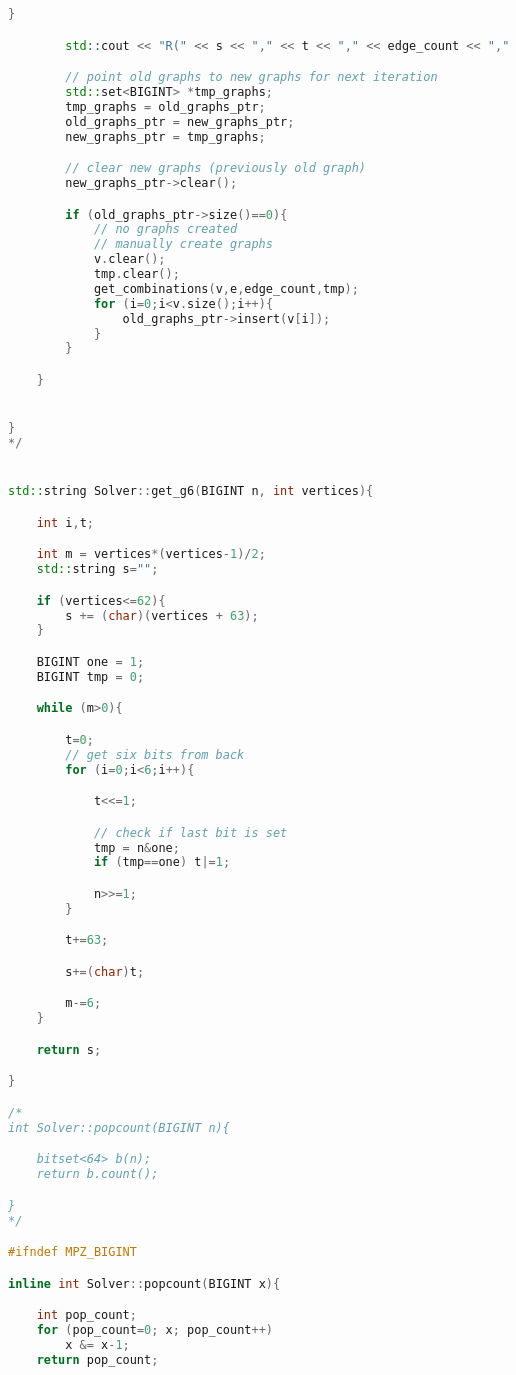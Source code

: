\documentclass[12pt]{etsu_thesis}
\begin{document}
\begin{lstlisting}[language=C++]
        }

        std::cout << "R(" << s << "," << t << "," << edge_count << "," << n << ") = " << new_graphs_ptr->size() << std::endl;

        // point old graphs to new graphs for next iteration
        std::set<BIGINT> *tmp_graphs;
        tmp_graphs = old_graphs_ptr;
        old_graphs_ptr = new_graphs_ptr;
        new_graphs_ptr = tmp_graphs;

        // clear new graphs (previously old graph)
        new_graphs_ptr->clear();  

        if (old_graphs_ptr->size()==0){
            // no graphs created
            // manually create graphs
            v.clear();
            tmp.clear();    
            get_combinations(v,e,edge_count,tmp);
            for (i=0;i<v.size();i++){
                old_graphs_ptr->insert(v[i]);
            }             
        }

    }


}
*/


std::string Solver::get_g6(BIGINT n, int vertices){

    int i,t;

    int m = vertices*(vertices-1)/2;
    std::string s="";

    if (vertices<=62){
    	s += (char)(vertices + 63);
    }

    BIGINT one = 1;
    BIGINT tmp = 0;

    while (m>0){

        t=0;
        // get six bits from back
        for (i=0;i<6;i++){

            t<<=1;

            // check if last bit is set
            tmp = n&one;
            if (tmp==one) t|=1;

            n>>=1;
        }

        t+=63;

        s+=(char)t;

        m-=6;
    }

    return s;

}

/*
int Solver::popcount(BIGINT n){

	bitset<64> b(n);
	return b.count();

}
*/

#ifndef MPZ_BIGINT

inline int Solver::popcount(BIGINT x){

    int pop_count;
    for (pop_count=0; x; pop_count++)
        x &= x-1;
    return pop_count;    
    

\end{lstlisting}
\end{document}
